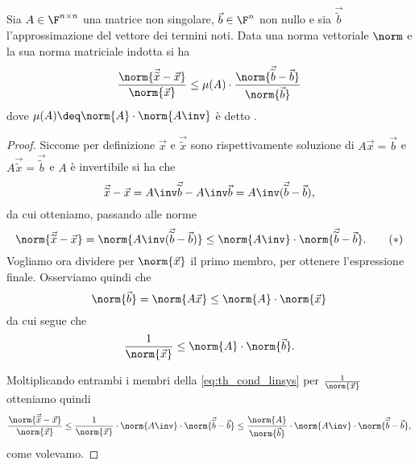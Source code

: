 \begin{theorem}{}{}
    Sia $A \in \Mat{\F, n, n}$ una matrice non singolare, $\vec b \in \F^n$ non nullo e sia $\vec{\tilde b}$ l'approssimazione del vettore dei termini noti. Data una norma vettoriale $\norm$ e la sua norma matriciale indotta si ha \[
        \frac{\norm{\vec{\tilde x} - \vec x}}{\norm{\vec x}} \leq \mu(A) \cdot\frac{\norm{\vec{\tilde b} - \vec b}}{\norm{\vec b}} 
    \] dove $\mu(A) \deq \norm{A} \cdot \norm{A\inv}$ è detto . 
\end{theorem}
\begin{proof}
    Siccome per definizione $\vec x$ e $\vec{\tilde x}$ sono rispettivamente soluzione di $A\vec x = \vec b$ e $A\vec{\tilde x} = \vec{\tilde b}$ e $A$ è invertibile si ha che \[
        \vec{\tilde x} - \vec x = A\inv\vec{\tilde b} - A\inv\vec b = A\inv(\vec{\tilde b} - \vec b),
    \] da cui otteniamo, passando alle norme \begin{equation}\label{eq:th_cond_linsys}
        \norm{\vec{\tilde x} - \vec x} = \norm{A\inv(\vec{\tilde b} - \vec b)} \leq \norm{A\inv} \cdot \norm{\vec{\tilde b} - \vec b}.  \tag{$\ast$}
    \end{equation} Vogliamo ora dividere per $\norm{\vec x}$ il primo membro, per ottenere l'espressione finale. Osserviamo quindi che \[
        \norm{\vec b} = \norm{A\vec x} \leq \norm{A} \cdot \norm{\vec x}
    \] da cui segue che \[
        \frac{1}{\norm{\vec x}} \leq \norm{A} \cdot \norm{\vec b}.
    \]

    Moltiplicando entrambi i membri della \eqref{eq:th_cond_linsys} per $\frac{1}{\norm{\vec x}}$ otteniamo quindi \[
        \frac{\norm{\vec{\tilde x} - \vec x}}{\norm{\vec x}} 
        \leq \frac{1}{\norm{\vec x}} \cdot \norm{A\inv} \cdot \norm{\vec{\tilde b} - \vec b}
        \leq \frac{\norm{A}}{\norm{\vec b}} \cdot \norm{A\inv} \cdot \norm{\vec{\tilde b} - \vec b},
    \] come volevamo.
\end{proof}
